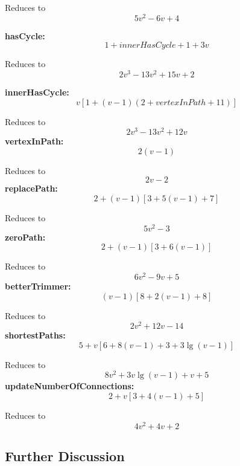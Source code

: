 \documentclass[12pt]{article}
\begin{document}
Reduces to
$$
5v^2 - 6v + 4
$$

\textbf{hasCycle:}
\begin{dmath*}
1 + innerHasCycle + 1 + 3v
\end{dmath*}

Reduces to
$$
2v^3 - 13v^2 + 15v + 2
$$

\textbf{innerHasCycle:}
\begin{dmath*}
v
\left[1 + (v - 1)
    \left(
        2 + vertexInPath + 11
    \right)
\right]
\end{dmath*}

Reduces to
$$
2v^3 - 13v^2 + 12v
$$
\textbf{vertexInPath:}
\begin{dmath*}
2(v - 1)
\end{dmath*}

Reduces to
$$
2v - 2
$$
\textbf{replacePath:}
\begin{dmath*}
2 + (v - 1)
\left[
    3 + 5(v - 1) + 7
\right]
\end{dmath*}

Reduces to
$$
5v^2 - 3
$$
\textbf{zeroPath:}
\begin{dmath*}
2 + 
(v - 1)
\left[
    3 + 6(v - 1)
\right]
\end{dmath*}

Reduces to
$$
6v^2 - 9v + 5
$$
\textbf{betterTrimmer:}
\begin{dmath*}
(v - 1)
\left[
    8 + 2(v - 1) + 8
\right] 
\end{dmath*}

Reduces to
$$
2v^2 + 12v - 14
$$
\textbf{shortestPaths:}
\begin{dmath*}
5 + v
\left[
    6 + 8(v - 1) + 3 + 3\lg(v - 1)
\right]
\end{dmath*}

Reduces to
$$
8v^2 + 3v\lg(v - 1) + v + 5
$$
%
\textbf{updateNumberOfConnections:}
\begin{dmath*}
2 + v
\left[
3 + 4(v - 1) + 5
\right]
\end{dmath*}

Reduces to
$$
4v^2 + 4v + 2
$$

\subsection*{Further Discussion}
\end{document}
